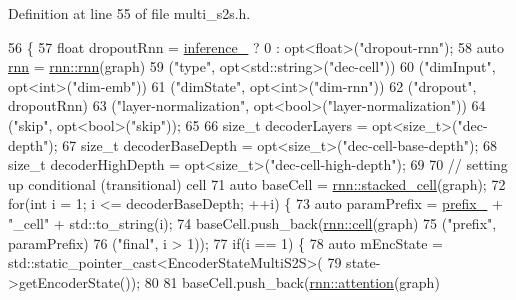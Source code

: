 Definition at line 55 of file multi\+\_\+s2s.\+h.


\begin{DoxyCode}
56                                                            \{
57   \textcolor{keywordtype}{float} dropoutRnn = \hyperlink{classmarian_1_1DecoderBase_a808975d515f60a53096f6794c3dc61d4}{inference\_} ? 0 : opt<float>(\textcolor{stringliteral}{"dropout-rnn"});
58   \textcolor{keyword}{auto} \hyperlink{namespacemarian_1_1rnn_aff1b115e415945b445f8d4a2068ec3e8}{rnn} = \hyperlink{namespacemarian_1_1rnn_aff1b115e415945b445f8d4a2068ec3e8}{rnn::rnn}(graph)
59              (\textcolor{stringliteral}{"type"}, opt<std::string>(\textcolor{stringliteral}{"dec-cell"}))
60              (\textcolor{stringliteral}{"dimInput"}, opt<int>(\textcolor{stringliteral}{"dim-emb"}))
61              (\textcolor{stringliteral}{"dimState"}, opt<int>(\textcolor{stringliteral}{"dim-rnn"}))
62              (\textcolor{stringliteral}{"dropout"}, dropoutRnn)
63              (\textcolor{stringliteral}{"layer-normalization"}, opt<bool>(\textcolor{stringliteral}{"layer-normalization"}))
64              (\textcolor{stringliteral}{"skip"}, opt<bool>(\textcolor{stringliteral}{"skip"}));
65 
66   \textcolor{keywordtype}{size\_t} decoderLayers = opt<size\_t>(\textcolor{stringliteral}{"dec-depth"});
67   \textcolor{keywordtype}{size\_t} decoderBaseDepth = opt<size\_t>(\textcolor{stringliteral}{"dec-cell-base-depth"});
68   \textcolor{keywordtype}{size\_t} decoderHighDepth = opt<size\_t>(\textcolor{stringliteral}{"dec-cell-high-depth"});
69 
70   \textcolor{comment}{// setting up conditional (transitional) cell}
71   \textcolor{keyword}{auto} baseCell = \hyperlink{namespacemarian_1_1rnn_a55385034d5ad19187245bb2b564cb7eb}{rnn::stacked\_cell}(graph);
72   \textcolor{keywordflow}{for}(\textcolor{keywordtype}{int} i = 1; i <= decoderBaseDepth; ++i) \{
73     \textcolor{keyword}{auto} paramPrefix = \hyperlink{classmarian_1_1DecoderBase_a043a90801b6bda9a45e309607136e947}{prefix\_} + \textcolor{stringliteral}{"\_cell"} + std::to\_string(i);
74     baseCell.push\_back(\hyperlink{namespacemarian_1_1rnn_af723e51535e0b11de5b28fe19627a3fb}{rnn::cell}(graph)
75                        (\textcolor{stringliteral}{"prefix"}, paramPrefix)
76                        (\textcolor{stringliteral}{"final"}, i > 1));
77     \textcolor{keywordflow}{if}(i == 1) \{
78       \textcolor{keyword}{auto} mEncState = std::static\_pointer\_cast<EncoderStateMultiS2S>(
79         state->getEncoderState());
80 
81       baseCell.push\_back(\hyperlink{namespacemarian_1_1rnn_a57316dc4c756edb2a8dfabea7e50d92b}{rnn::attention}(graph)

\end{DoxyCode}

